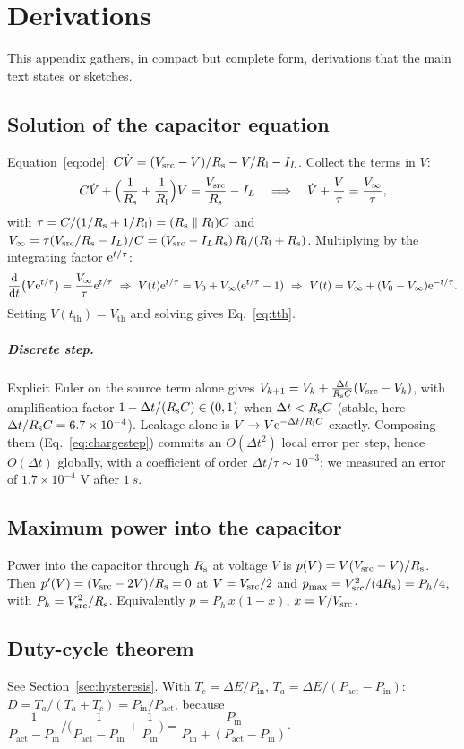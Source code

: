 \chapter{Derivations}
\label{app:derivations}

This appendix gathers, in compact but complete form, derivations that the main text states or sketches.

\section{Solution of the capacitor equation}
\label{app:rc}

Equation~\eqref{eq:ode}: $C\dot V=(V_{\mathrm{src}}-V)/R_{\mathrm{s}}-V/R_{\mathrm{l}}-I_L$. Collect the terms in $V$:
\[
 C\dot V+\Big(\frac1{R_{\mathrm{s}}}+\frac1{R_{\mathrm{l}}}\Big)V=\frac{V_{\mathrm{src}}}{R_{\mathrm{s}}}-I_L
 \quad\Longrightarrow\quad
 \dot V+\frac V\tau=\frac{V_\infty}{\tau},
\]
with $\tau=C/(1/R_{\mathrm{s}}+1/R_{\mathrm{l}})=(R_{\mathrm{s}}\parallel R_{\mathrm{l}})C$ and $V_\infty=\tau(V_{\mathrm{src}}/R_{\mathrm{s}}-I_L)/C=(V_{\mathrm{src}}-I_LR_{\mathrm{s}})\,R_{\mathrm{l}}/(R_{\mathrm{l}}+R_{\mathrm{s}})$. Multiplying by the integrating factor $\mathrm{e}^{t/\tau}$:
\[
 \frac{\mathrm d}{\mathrm dt}\big(V\mathrm{e}^{t/\tau}\big)=\frac{V_\infty}{\tau}\mathrm{e}^{t/\tau}
 \ \Rightarrow\
 V(t)\mathrm{e}^{t/\tau}=V_0+V_\infty(\mathrm{e}^{t/\tau}-1)
 \ \Rightarrow\
 V(t)=V_\infty+(V_0-V_\infty)\mathrm{e}^{-t/\tau}.
\]
Setting $V(t_{\mathrm{th}})=V_{\mathrm{th}}$ and solving gives Eq.~\eqref{eq:tth}.

\paragraph{Discrete step.} Explicit Euler on the source term alone gives $V_{k+1}=V_k+\frac{\Delta t}{R_{\mathrm{s}} C}(V_{\mathrm{src}}-V_k)$, with amplification factor $1-\Delta t/(R_{\mathrm{s}} C)\in(0,1)$ when $\Delta t<R_{\mathrm{s}} C$ (stable, here $\Delta t/R_{\mathrm{s}} C=6.7\times10^{-4}$). Leakage alone is $V\to V\mathrm{e}^{-\Delta t/R_{\mathrm{l}} C}$ exactly. Composing them (Eq.~\eqref{eq:chargestep}) commits an $O(\Delta t^2)$ local error per step, hence $O(\Delta t)$ globally, with a coefficient of order $\Delta t/\tau\sim10^{-3}$: we measured an error of $1.7\times10^{-4}$ V after $\SI{1}{s}$.

\section{Maximum power into the capacitor}
Power into the capacitor through $R_{\mathrm{s}}$ at voltage $V$ is $p(V)=V(V_{\mathrm{src}}-V)/R_{\mathrm{s}}$. Then $p'(V)=(V_{\mathrm{src}}-2V)/R_{\mathrm{s}}=0$ at $V=V_{\mathrm{src}}/2$ and $p_{\max}=V_{\mathrm{src}}^2/(4R_{\mathrm{s}})=P_h/4$, with $P_h=V_{\mathrm{src}}^2/R_{\mathrm{s}}$. Equivalently $p=P_h\,x(1-x)$, $x=V/V_{\mathrm{src}}$.

\section{Duty-cycle theorem}
See Section~\ref{sec:hysteresis}. With $T_c=\Delta E/P_{\mathrm{in}}$, $T_a=\Delta E/(P_{\mathrm{act}}-P_{\mathrm{in}})$: $D=T_a/(T_a+T_c)=P_{\mathrm{in}}/P_{\mathrm{act}}$, because
$\dfrac1{P_{\mathrm{act}}-P_{\mathrm{in}}}\Big/\Big(\dfrac1{P_{\mathrm{act}}-P_{\mathrm{in}}}+\dfrac1{P_{\mathrm{in}}}\Big)=\dfrac{P_{\mathrm{in}}}{P_{\mathrm{in}}+(P_{\mathrm{act}}-P_{\mathrm{in}})}$.

